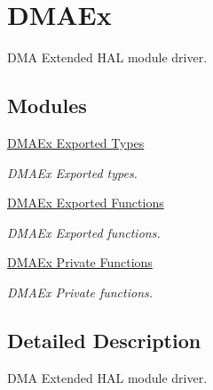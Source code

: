 \hypertarget{group___d_m_a_ex}{}\section{D\+M\+A\+Ex}
\label{group___d_m_a_ex}


D\+MA Extended H\+AL module driver.  


\subsection*{Modules}
\begin{DoxyCompactItemize}
\item 
\hyperlink{group___d_m_a_ex___exported___types}{D\+M\+A\+Ex Exported Types}
\begin{DoxyCompactList}\small\item\em D\+M\+A\+Ex Exported types. \end{DoxyCompactList}\item 
\hyperlink{group___d_m_a_ex___exported___functions}{D\+M\+A\+Ex Exported Functions}
\begin{DoxyCompactList}\small\item\em D\+M\+A\+Ex Exported functions. \end{DoxyCompactList}\item 
\hyperlink{group___d_m_a_ex___private___functions}{D\+M\+A\+Ex Private Functions}
\begin{DoxyCompactList}\small\item\em D\+M\+A\+Ex Private functions. \end{DoxyCompactList}\end{DoxyCompactItemize}


\subsection{Detailed Description}
D\+MA Extended H\+AL module driver. 

